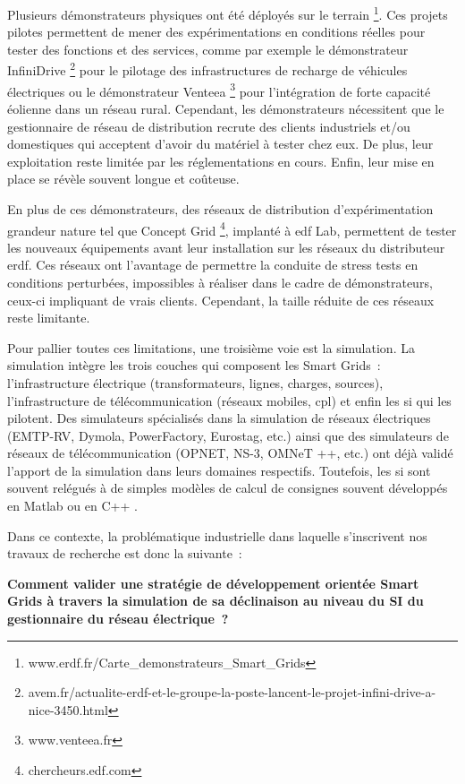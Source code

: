 Plusieurs démonstrateurs physiques ont été déployés sur le terrain 
\footnote{www.erdf.fr/Carte\_demonstrateurs\_Smart\_Grids}. Ces projets pilotes 
permettent de mener des expérimentations en conditions réelles pour tester des 
fonctions et des services, comme par exemple le démonstrateur InfiniDrive 
\footnote{avem.fr/actualite-erdf-et-le-groupe-la-poste-lancent-le-projet-infini-drive-a-nice-3450.html} 
pour le pilotage des infrastructures de recharge de véhicules électriques ou le 
démonstrateur Venteea \footnote{www.venteea.fr} pour l'intégration de forte 
capacité éolienne dans un réseau rural. Cependant, les démonstrateurs 
nécessitent que le gestionnaire de réseau de distribution recrute des clients 
industriels et/ou domestiques qui acceptent d'avoir du matériel à tester chez 
eux. De plus, leur exploitation reste limitée par les réglementations en cours. 
Enfin, leur mise en place se révèle souvent longue et coûteuse. 

En plus de ces démonstrateurs, des réseaux de distribution d'expérimentation 
grandeur nature tel que Concept Grid \footnote{chercheurs.edf.com}, implanté à 
\gls{edf} Lab, permettent de tester les nouveaux équipements avant leur 
installation sur les réseaux du distributeur \gls{erdf}. Ces réseaux ont 
l'avantage de permettre la conduite de stress tests en conditions perturbées, 
impossibles à réaliser dans le cadre de démonstrateurs, ceux-ci impliquant de 
vrais clients. Cependant, la taille réduite de ces réseaux reste limitante. 

Pour pallier toutes ces limitations, une troisième voie est la simulation. La 
simulation intègre les trois couches qui composent les Smart Grids~: 
l'infrastructure électrique (transformateurs, lignes, charges, sources), 
l'infrastructure de télécommunication (réseaux mobiles, \gls{cpl}) et enfin les \gls{si} qui 
les pilotent. Des simulateurs spécialisés dans la simulation de réseaux 
électriques (EMTP-RV, Dymola, PowerFactory, Eurostag, etc.) ainsi que des 
simulateurs de réseaux de télécommunication (OPNET, NS-3, OMNeT ++, etc.) ont 
déjà validé l'apport de la simulation dans leurs domaines respectifs. Toutefois, 
les \gls{si} sont souvent relégués à de simples modèles de calcul de consignes souvent 
développés en Matlab ou en C++ \cite{palensky2014simulating}. 

Dans ce contexte, la problématique industrielle dans laquelle  s'inscrivent nos 
travaux de recherche est donc la suivante~: 

\textbf{Comment valider une stratégie de développement orientée Smart Grids à 
travers la simulation de sa déclinaison au niveau du SI du gestionnaire du 
réseau électrique~?}

